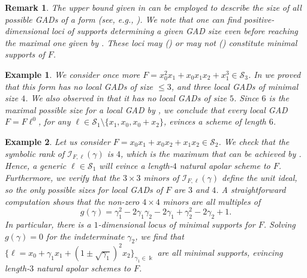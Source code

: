 \documentclass{amsart}
\theoremstyle{plain}
\newtheorem{definition}[definition]{Definition}
\newtheorem{example}[example]{Example}
\newtheorem{remark}[remark]{Remark}
\renewcommand{\k}{\Bbbk}
\renewcommand{\S}{\mathcal{S}}
\def\c{\gamma}
\numberwithin{equation}{section}
\begin{document}

\begin{remark}
    The upper bound given in  can be employed to describe the size of \emph{all} possible GADs of a form (see, e.g., ).
    We note that one can find positive-dimensional loci of supports determining a given GAD size even before reaching the maximal one given by .
    These loci may () or may not () constitute minimal supports of $F$.
\end{remark}

\begin{example} \label{ex:runningexample}
    We consider once more $F = x_0^2x_1 + x_0x_1x_2 + x_1^3 \in \S_3$.
    In  we proved that this form has no local GADs of size $\leq 3$, and three local GADs of minimal size $4$.
    We also observed in  that it has no local GADs of size $5$.
    Since $6$ is the maximal possible size for a local GAD by , we conclude that every local GAD $F = F \ell^0$, for any $\ell \in \S_1 \setminus\{x_1,x_0,x_0+x_2\}$, evinces a scheme of length $6$.
\end{example}

\begin{example} \label{ex:InfiniteMinimalLocus}
    Let us consider $F = x_0x_1+x_0x_2+x_1x_2 \in \S_2$.
    We check that the symbolic rank of $\mathcal{I}_{F,\ell}(\c)$ is $4$, which is the maximum that can be achieved by .
    Hence, a generic $\ell \in \S_1$ will evince a length-$4$ natural apolar scheme to $F$.
    Furthermore, we verify that the $3 \times 3$ minors of $\mathcal{I}_{F,\ell}(\c)$ define the unit ideal, so the only possible sizes for local GADs of $F$ are $3$ and $4$.
    A straightforward computation shows that the non-zero $4 \times 4$ minors are all multiples of 
    \[ g(\c) = \c_1^2 - 2\c_1\c_2 - 2\c_1 + \c_2^2 - 2\c_2 + 1. \]
    In particular, there is a $1$-dimensional locus of minimal supports for $F$.
    Solving $g(\c)=0$ for the indeterminate $\c_2$, we find that $\{ \ell = x_0 + \gamma_1 x_1 + (1 \pm \sqrt{\gamma_1})^2x_2 \}_{\gamma_1 \in \k}$ are all minimal supports, evincing length-$3$ natural apolar schemes to $F$.
\end{example}
\end{document}
